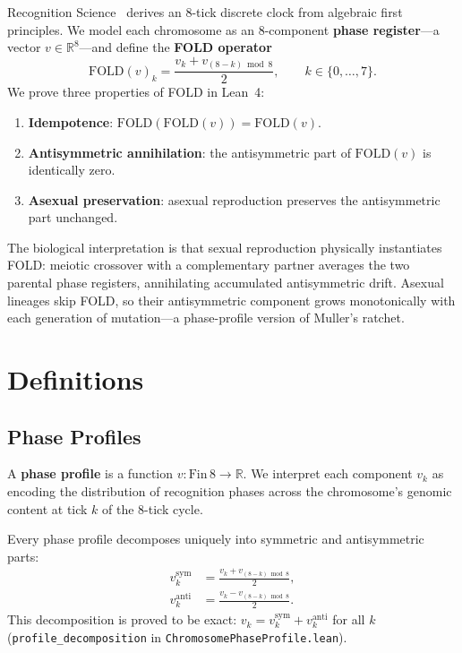 \documentclass[11pt,twocolumn]{article}
\begin{document}
Recognition Science~\cite{Washburn2025} derives an 8-tick discrete clock
from algebraic first principles. We model each chromosome as an
8-component \textbf{phase register}---a vector
$v \in \mathbb{R}^8$---and define the \textbf{FOLD operator}
\begin{equation}\label{eq:fold}
  \mathrm{FOLD}(v)_k = \frac{v_k + v_{(8-k) \bmod 8}}{2},
  \qquad k \in \{0, \ldots, 7\}.
\end{equation}
We prove three properties of FOLD in Lean~4:
\begin{enumerate}
\item \textbf{Idempotence}: $\mathrm{FOLD}(\mathrm{FOLD}(v)) =
  \mathrm{FOLD}(v)$.
\item \textbf{Antisymmetric annihilation}: the antisymmetric part of
  $\mathrm{FOLD}(v)$ is identically zero.
\item \textbf{Asexual preservation}: asexual reproduction preserves the
  antisymmetric part unchanged.
\end{enumerate}
The biological interpretation is that sexual reproduction physically
instantiates FOLD: meiotic crossover with a complementary partner averages
the two parental phase registers, annihilating accumulated antisymmetric
drift. Asexual lineages skip FOLD, so their antisymmetric component grows
monotonically with each generation of mutation---a phase-profile version
of Muller's ratchet.

\section{Definitions}

\subsection{Phase Profiles}

A \textbf{phase profile} is a function $v : \mathrm{Fin}\,8 \to
\mathbb{R}$. We interpret each component $v_k$ as encoding the
distribution of recognition phases across the chromosome's genomic
content at tick $k$ of the 8-tick cycle.

Every phase profile decomposes uniquely into symmetric and antisymmetric
parts:
\begin{align}
  v^{\mathrm{sym}}_k &= \frac{v_k + v_{(8-k) \bmod 8}}{2},
  \label{eq:sym} \\
  v^{\mathrm{anti}}_k &= \frac{v_k - v_{(8-k) \bmod 8}}{2}.
  \label{eq:anti}
\end{align}
This decomposition is proved to be exact:
$v_k = v^{\mathrm{sym}}_k + v^{\mathrm{anti}}_k$ for all $k$
(\texttt{profile\_decomposition} in
\texttt{ChromosomePhaseProfile.lean}).
\end{document}
